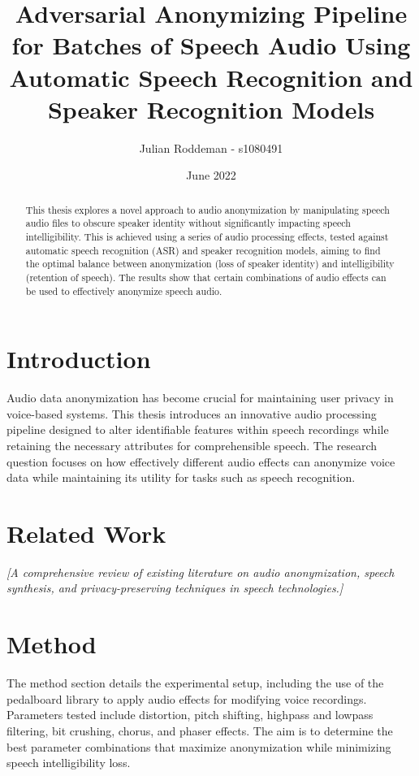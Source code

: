\documentclass{article}
\title{Adversarial Anonymizing Pipeline for Batches of Speech Audio Using Automatic Speech Recognition and Speaker Recognition Models}
\author{Julian Roddeman - s1080491}
\date{June 2022}
\begin{document}
\maketitle

\begin{abstract}
    This thesis explores a novel approach to audio anonymization by manipulating
    speech audio files to obscure speaker identity without significantly
    impacting speech intelligibility. This is achieved using a series of audio
    processing effects, tested against automatic speech recognition (ASR) and
    speaker recognition models, aiming to find the optimal balance between
    anonymization (loss of speaker identity) and intelligibility (retention of
    speech). The results show that certain combinations of audio effects can be
    used to effectively anonymize speech audio.
\end{abstract}

\section{Introduction}
    Audio data anonymization has become crucial for maintaining user privacy in voice-based systems. This thesis introduces an innovative audio processing pipeline designed to alter identifiable features within speech recordings while retaining the necessary attributes for comprehensible speech. The research question focuses on how effectively different audio effects can anonymize voice data while maintaining its utility for tasks such as speech recognition.

\section{Related Work}
    \textit{[A comprehensive review of existing literature on audio anonymization, speech synthesis, and privacy-preserving techniques in speech technologies.]}

\section{Method}
    The method section details the experimental setup, including the use of the pedalboard library to apply audio effects for modifying voice recordings. Parameters tested include distortion, pitch shifting, highpass and lowpass filtering, bit crushing, chorus, and phaser effects. The aim is to determine the best parameter combinations that maximize anonymization while minimizing speech intelligibility loss.
\end{document}
